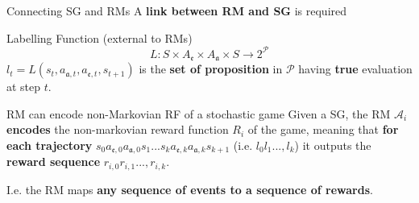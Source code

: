 \documentclass[10pt, aspectratio=169]{beamer}
\newcommand{\evidenzia}[1]{\textcolor{verdeSalvia}{\textbf{#1}}}
\begin{document}
\begin{frame}{Connecting SG and RMs}
    A \evidenzia{link between RM and SG} is required %
    \vspace{0.2cm}
    
    \begin{block}{Labelling Function ({\footnotesize external to RMs})}
        \[L: S \times A_{\mathfrak{e}} \times A_{\mathfrak{a}} \times S \rightarrow 2^{\mathcal{P}}\]
        $l_t = L(s_t, a_{\mathfrak{a},t}, a_{\mathfrak{e},t}, s_{t+1})$ is the \evidenzia{set of proposition} in $\mathcal{P}$ having \evidenzia{true} evaluation at step $t$. %
    \end{block}
    \vspace{0.2cm}
    \begin{block}{RM can encode non-Markovian RF of a stochastic game}
    Given a SG, the RM $\mathcal{A}_i$ \evidenzia{encodes} the non-markovian reward function $R_i$ of the game, meaning that \evidenzia{for each trajectory}
    $s_{0}a_{\mathfrak{e},0}a_{\mathfrak{a},0}s_{1}...s_{k}a_{\mathfrak{e},k}a_{\mathfrak{a},k}s_{k+1}$ (i.e. $l_0l_1...,l_k$) it outputs the \evidenzia{reward sequence} $r_{i,0}r_{i,1}...,r_{i,k}$.
    \end{block}
    \vspace{0.2cm}
    I.e. the RM maps \evidenzia{any sequence of events to a sequence of rewards}.
    
\end{frame}
\end{document}
